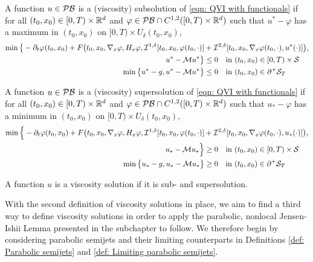 \begin{definition}
\label{def: Viscosity solution 2}
    A function $u \in \mathcal{PB}$ is a (viscosity) subsolution of \eqref{eqn: QVI with functionals} if for all $(t_0,x_0) \in [0,T) \times \mathbb{R}^d$ and $\varphi \in \mathcal{PB} \cap C^{1,2}([0,T) \times \mathbb{R}^d)$ such that $u^* - \varphi$ has a maximum in $(t_0,x_0)$ on $[0,T) \times U_{\delta}(t_0,x_0)$,
    \begin{equation*}
        \begin{aligned}
            \min \big\{-\partial_t\varphi(t_0,x_0) + F\big( t_0,x_0, \nabla_x \varphi, H_x \varphi, \mathcal{I}^{1,\delta}[t_0,x_0,\varphi(t_0,\cdot)] &+ \mathcal{I}^{2,\delta}[t_0,x_0,\nabla_x \varphi(t_0,\cdot), u^*(\cdot)] \big), \\
            u^*-\mathcal{M} u^* \big\} &\leq 0 \quad \text{in } (t_0,x_0) \in [0,T)\times \mathcal{S} \\
            \min \big\{ u^* - g, u^* - \mathcal{M} u^* \big\} &\leq 0 \quad  \text{in } (t_0,x_0) \in \partial^+ \mathcal{S}_T
        \end{aligned}
    \end{equation*}
    
    A function $u \in \mathcal{PB}$ is a (viscosity) supersolution of \eqref{eqn: QVI with functionals} if for all $(t_0,x_0) \in [0,T) \times \mathbb{R}^d$ and $\varphi \in \mathcal{PB} \cap C^{1,2}([0,T) \times \mathbb{R}^d)$ such that $u_* - \varphi$ has a minimum in $(t_0,x_0)$ on $[0,T) \times U_{\delta}(t_0,x_0)$,
    \begin{align*}
        \min \Big\{ - \partial_t \varphi(t_0,x_0) + F\big( t_0,x_0, \nabla_x \varphi, H_x \varphi, \mathcal{I}^{1,\delta}[t_0,x_0,\varphi(t_0,\cdot)] &+ \mathcal{I}^{2,\delta}[t_0,x_0,\nabla_x \varphi(t_0,\cdot), u_*(\cdot)] \big), \\
        u_*-\mathcal{M} u_* \Big\} &\geq 0 \quad \text{in } (t_0,x_0) \in [0,T)\times \mathcal{S} \\
        \min \big\{ u_* - g, u_* - \mathcal{M} u_* \big\} &\geq 0 \quad \text{in } (t_0,x_0) \in \partial^+ \mathcal{S}_T
    \end{align*}

    A function $u$ is a viscosity solution if it is sub- and supersolution. 
\end{definition}

With the second definition of viscosity solutions in place, we aim to find a third way to define viscosity solutions in order to apply the parabolic, nonlocal Jensen-Ishii Lemma presented in the subchapter to follow. We therefore begin by considering parabolic semijets and their limiting counterparts in Definitions \ref{def: Parabolic semijets} and \ref{def: Limiting parabolic semijets}. 

